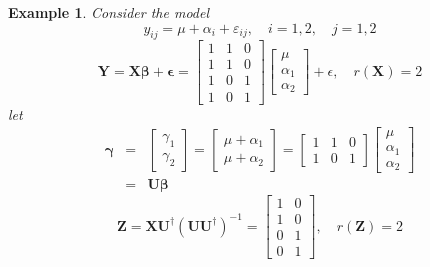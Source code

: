 \documentclass{article}
\newtheorem{example}[theorem]{Example}
\begin{document}
\bigskip

\begin{example}
Consider the model%
\begin{equation*}
y_{ij}=\mu +\alpha _{i}+\varepsilon _{ij},\quad i=1,2,\quad j=1,2
\end{equation*}%
\begin{equation*}
\mathbf{Y=X\beta +\epsilon =}\left[ 
\begin{array}{ccc}
1 & 1 & 0 \\ 
1 & 1 & 0 \\ 
1 & 0 & 1 \\ 
1 & 0 & 1%
\end{array}%
\right] \left[ 
\begin{array}{c}
\mu \\ 
\alpha _{1} \\ 
\alpha _{2}%
\end{array}%
\right] +\epsilon ,\quad r\left( \mathbf{X}\right) =2
\end{equation*}%
\newline
let%
\begin{eqnarray*}
\mathbf{\gamma } &\mathbf{=}&\left[ 
\begin{array}{c}
\gamma _{1} \\ 
\gamma _{2}%
\end{array}%
\right] =\left[ 
\begin{array}{c}
\mu +\alpha _{1} \\ 
\mu +\alpha _{2}%
\end{array}%
\right] =\left[ 
\begin{array}{ccc}
1 & 1 & 0 \\ 
1 & 0 & 1%
\end{array}%
\right] \left[ 
\begin{array}{c}
\mu \\ 
\alpha _{1} \\ 
\alpha _{2}%
\end{array}%
\right] \\
&=&\mathbf{U\beta }
\end{eqnarray*}%
\begin{equation*}
\mathbf{Z}=\mathbf{XU}^{\dagger }\left( \mathbf{UU}^{\dagger }\right) ^{-1}=%
\left[ 
\begin{array}{cc}
1 & 0 \\ 
1 & 0 \\ 
0 & 1 \\ 
0 & 1%
\end{array}%
\right] ,\quad r\left( \mathbf{Z}\right) =2
\end{equation*}%

\end{example}
\end{document}
